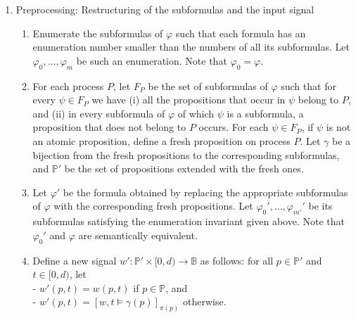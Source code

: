 \documentclass[envcountsame, runningheads]{llncs}
\newcommand{\rednote}[2][]{{\todo[color=magenta!80,size=\footnotesize,#1]{\normalcolor\normalfont#2}}}
\newcommand{\B}{\mathbb{B}}
\newcommand{\?}{\text{?}}
\begin{document}
	\begin{enumerate}
		\item Preprocessing: Restructuring of the subformulas and the input signal
		\begin{enumerate}[label=\arabic*.]
			\item Enumerate the subformulas of $\varphi$ such that each formula has an enumeration number smaller than the numbers of all its subformulas. Let $\varphi_0, \ldots, \varphi_m$ be such an enumeration. Note that $\varphi_0 = \varphi$.
			\item For each process $P$, let $F_P$ be the set of subformulas of $\varphi$ such that for every  $\psi \in F_P$ we have (i) all the propositions that occur in $\psi$ belong to $P$, and (ii) in every subformula of $\varphi$ of which $\psi$ is a subformula, a proposition that does not belong to $P$ occurs. For each $\psi \in F_P$, if $\psi$ is not an atomic proposition, define a fresh proposition on process $P$. Let $\gamma$ be a bijection from the fresh propositions to the corresponding subformulas, and $\mathbb{P}'$ be the set of propositions extended with the fresh ones.
			\item Let $\varphi'$ be the formula obtained by replacing the appropriate subformulas of $\varphi$ with the corresponding fresh propositions. Let $\varphi_0', \ldots, \varphi_{m'}'$ be its subformulas satisfying the enumeration invariant given above. Note that $\varphi_0'$  and $\varphi$ are semantically equivalent. %
			\item Define a new signal $w' : \mathbb{P}' \times [0,d) \to \B$ as follows: for all $p \in \mathbb{P}'$ and $t \in [0,d)$, let \\
			- $w'(p,t) = w(p,t)$ if $p \in \mathbb{P}$, and\\
			- $w'(p,t) = [w,t \models \gamma(p)]_{\pi(p)}$ otherwise.
		\end{enumerate}
		

\end{enumerate}
\end{document}
